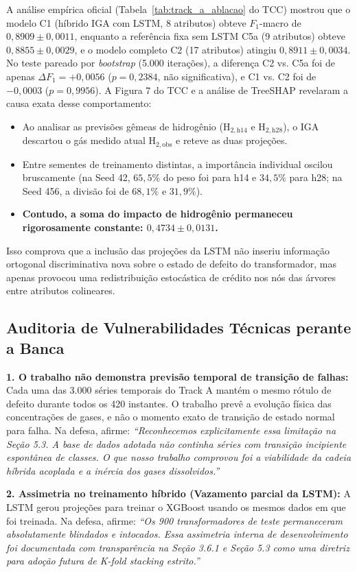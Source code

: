 \documentclass[11pt,a4paper]{article}
\begin{document}
A análise empírica oficial (Tabela~\ref{tab:track_a_ablacao} do TCC) mostrou que o modelo C1 (híbrido IGA com LSTM, 8 atributos) obteve $F_1$-macro de $0{,}8909 \pm 0{,}0011$, enquanto a referência fixa sem LSTM C5a (9 atributos) obteve $0{,}8855 \pm 0{,}0029$, e o modelo completo C2 (17 atributos) atingiu $0{,}8911 \pm 0{,}0034$. No teste pareado por \textit{bootstrap} (5.000 iterações), a diferença C2 vs. C5a foi de apenas $\Delta F_1 = +0{,}0056$ ($p = 0{,}2384$, não significativa), e C1 vs. C2 foi de $-0{,}0003$ ($p = 0{,}9956$). A Figura 7 do TCC e a análise de TreeSHAP revelaram a causa exata desse comportamento:
\begin{itemize}[leftmargin=*]
  \item Ao analisar as previsões gêmeas de hidrogênio ($\text{H}_{2, \text{h14}}$ e $\text{H}_{2, \text{h28}}$), o IGA descartou o gás medido atual $\text{H}_{2, \text{obs}}$ e reteve as duas projeções.
  \item Entre sementes de treinamento distintas, a importância individual oscilou bruscamente (na Seed 42, $65{,}5\%$ do peso foi para h14 e $34{,}5\%$ para h28; na Seed 456, a divisão foi de $68{,}1\%$ e $31{,}9\%$).
  \item \textbf{Contudo, a soma do impacto de hidrogênio permaneceu rigorosamente constante: $0{,}4734 \pm 0{,}0131$.}
\end{itemize}
Isso comprova que a inclusão das projeções da LSTM não inseriu informação ortogonal discriminativa nova sobre o estado de defeito do transformador, mas apenas provocou uma redistribuição estocástica de crédito nos nós das árvores entre atributos colineares.

\subsection{Auditoria de Vulnerabilidades Técnicas perante a Banca}

\begin{defensebox}
\textbf{1. O trabalho não demonstra previsão temporal de transição de falhas:}
Cada uma das 3.000 séries temporais do Track A mantém o mesmo rótulo de defeito durante todos os 420 instantes. O trabalho prevê a evolução física das concentrações de gases, e não o momento exato de transição de estado normal para falha. Na defesa, afirme: \textit{``Reconhecemos explicitamente essa limitação na Seção 5.3. A base de dados adotada não continha séries com transição incipiente espontânea de classes. O que nosso trabalho comprovou foi a viabilidade da cadeia híbrida acoplada e a inércia dos gases dissolvidos.''}

\textbf{2. Assimetria no treinamento híbrido (Vazamento parcial da LSTM):}
A LSTM gerou projeções para treinar o XGBoost usando os mesmos dados em que foi treinada. Na defesa, afirme: \textit{``Os 900 transformadores de teste permaneceram absolutamente blindados e intocados. Essa assimetria interna de desenvolvimento foi documentada com transparência na Seção 3.6.1 e Seção 5.3 como uma diretriz para adoção futura de K-fold stacking estrito.''}
\end{defensebox}
\end{document}
